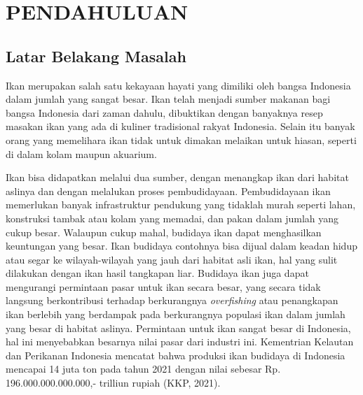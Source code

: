 
\chapter{PENDAHULUAN}

\section{Latar Belakang Masalah}

Ikan merupakan salah satu kekayaan hayati yang dimiliki oleh bangsa Indonesia 
dalam jumlah yang sangat besar. Ikan telah menjadi sumber makanan bagi bangsa 
Indonesia dari zaman dahulu, dibuktikan dengan banyaknya resep masakan ikan yang 
ada di kuliner tradisional rakyat Indonesia. Selain itu banyak orang yang 
memelihara ikan tidak untuk dimakan melaikan untuk hiasan, seperti di dalam 
kolam maupun akuarium.

Ikan bisa didapatkan melalui dua sumber, dengan menangkap ikan dari habitat 
aslinya dan dengan melalukan proses pembudidayaan. Pembudidayaan ikan 
memerlukan banyak infrastruktur pendukung yang tidaklah murah seperti 
lahan, konstruksi tambak atau kolam yang memadai, dan pakan dalam jumlah 
yang cukup besar. Walaupun cukup mahal, budidaya ikan dapat 
menghasilkan keuntungan yang besar. Ikan budidaya contohnya bisa dijual 
dalam keadan hidup atau segar ke wilayah-wilayah yang jauh dari habitat asli ikan, 
hal yang sulit dilakukan dengan ikan hasil tangkapan liar. Budidaya ikan 
juga dapat mengurangi permintaan pasar untuk ikan secara besar, yang secara tidak 
langsung berkontribusi terhadap berkurangnya \textit{overfishing} atau penangkapan 
ikan berlebih yang berdampak pada berkurangnya populasi ikan dalam jumlah 
yang besar di habitat aslinya. Permintaan untuk ikan sangat besar di 
Indonesia, hal ini menyebabkan besarnya nilai pasar dari industri ini. 
Kementrian Kelautan dan Perikanan Indonesia mencatat bahwa 
produksi ikan budidaya di Indonesia mencapai 14 juta ton pada tahun 
2021 dengan nilai sebesar Rp. 196.000.000.000.000,- trilliun rupiah (KKP, 2021).

